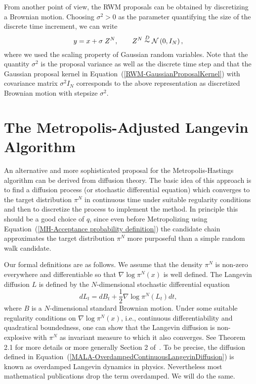 \begin{rem}
 From another point of view, the RWM proposals can be obtained by discretizing a Brownian motion. Choosing $ \sigma^2 > 0 $ as the parameter quantifying the size of the
discrete time increment, we can write
\begin{equation}
 y = x + \sigma \; Z^N, \qquad Z^N \stackrel{D}{\thicksim} \mathcal{N}\left( 0, I_N \right),
\end{equation}
where we used the scaling property of Gaussian random variables. Note that the quantity $ \sigma^2 $ is the proposal variance as well as the discrete time step and that the Gaussian proposal kernel in Equation~(\ref{RWM-GaussianProposalKernel}) with covariance matrix $ \sigma^2 I_N $ corresponds to the above representation as discretized Brownian motion with stepsize $ \sigma^2 $.
\end{rem}





 

\section{The Metropolis-Adjusted Langevin Algorithm}
\label{MH-MALA}

An alternative and more sophisticated proposal for the Metropolis-Hastings algorithm can be derived from diffusion theory. The basic idea of this approach is to find a diffusion process (or stochastic differential equation) which converges to the target distribution $ \pi^{N} $ in continuous time under suitable regularity conditions and then to discretize the process to implement the method. In principle this should be a good choice of $q$, since even before Metropolizing using Equation~(\ref{MH-Acceptance probability definition}) the candidate chain approximates the target distribution $ \pi^{N} $ more purposeful than a simple random walk candidate.

Our formal definitions are as follows. We assume that the density $ \pi ^{N} $ is non-zero everywhere and differentiable so that $ \nabla \log \pi^{N}(x) $ is well defined. The  Langevin diffusion $L$  is defined by the $N$-dimensional stochastic differential equation
\begin{equation}
 \label{MALA-OverdampedContinuousLangevinDiffusion}
 dL_t = dB_t + \frac{1}{2} \nabla \log \pi^{N}(L_t)dt,
\end{equation}
where $B$ is a $N$-dimensional standard Brownian motion. Under some suitable regularity conditions on $ \nabla \log \pi^{N}(x) $, i.e., continuous differentiability and quadratical boundedness, one can show that the Langevin diffusion is non-explosive with $ \pi^{N} $ as invariant measure to which it also converges. See Theorem 2.1  for more details or more generally Section 2 of~\autocite{TweedieRoberts1996}. To be precise, the diffusion defined in Equation~(\ref{MALA-OverdampedContinuousLangevinDiffusion}) is known as overdamped Langevin dynamics in physics. Nevertheless most mathematical publications drop the term overdamped. We will do the same.


